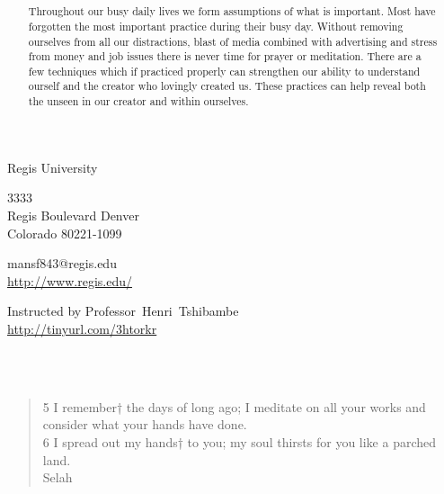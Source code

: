 \documentclass[11pt,a4paper]{scrartcl} %
\begin{document}
\pagecolor{Sepia!20}
\begin{cv}{}
        \begin{cvlist}{\textcolor{brown}{}}\label{PersDat}  
            \item   Regis University
            \item   3333\\
                    Regis Boulevard Denver \\	
                    Colorado 80221-1099
            \item   mansf843@regis.edu\\				
                    \url{http://www.regis.edu/}				
        \end{cvlist}
        \begin{cvlist}{}\label{irgendwas}
            \item Instructed by Professor~Henri~Tshibambe\\
             \url{http://tinyurl.com/3htorkr}
        \end{cvlist}
    \end{cv}
\clearpage
\noindent
\begin{center}
\textcolor{Maroon}{}\\
\textcolor{Maroon}{}\\
\begin{verse}
5 I remember† the days of long ago; I meditate on all your works and consider what your hands have done. \\
6 I spread out my hands† to you; my soul thirsts for you like a parched land.\\ 
Selah 
\end{verse}
\end{center}

\clearpage
\title{\textcolor{Maroon}{\rmfamily\normalfont{}}}
    \author{\textcolor{brown}{}}
    \date{} %
    
    \maketitle
    
 \begin{abstract}
Throughout our busy daily lives we form assumptions of what is important. Most have forgotten the most important practice during their busy day. Without removing ourselves from all our distractions, blast of media combined with advertising and stress from money and job issues there is never time for prayer or meditation. There are a few techniques which if practiced properly can strengthen our ability to understand ourself and the creator who lovingly created us. These practices can help reveal both the unseen in our creator and within ourselves.
 \end{abstract}
       
\end{document}
